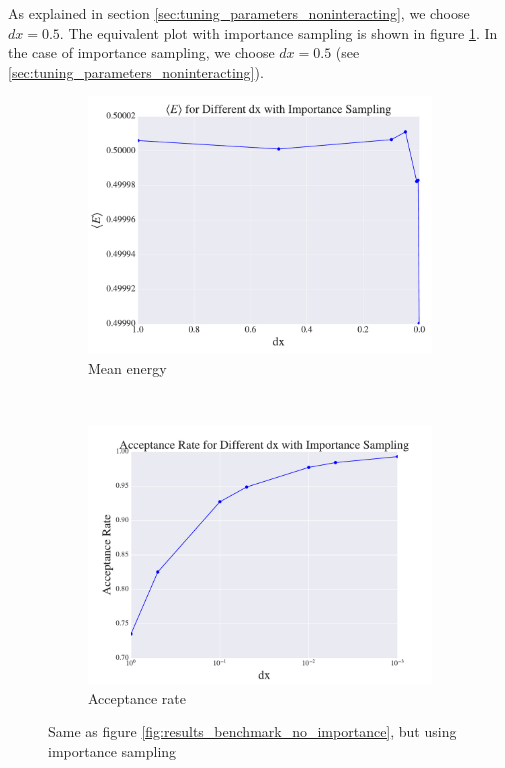 \documentclass[a4paper, 10pt]{article}
\begin{document}
\linebreak
As explained in section \ref{sec:tuning_parameters_noninteracting}, we choose $dx=0.5$. The equivalent plot with importance sampling is shown in figure \ref{fig:results_benchmark_importance}. In the case of importance sampling, we choose $dx=0.5$ (see \ref{sec:tuning_parameters_noninteracting}).
\begin{figure}[ht!]
	\centering
	\begin{subfigure}[b]{0.8\textwidth}
		\centering
		\includegraphics[width=\textwidth]{../Results/E_v_dx_importance.pdf}
		\caption{Mean energy}
	\end{subfigure}
	~
	\begin{subfigure}[b]{0.8\textwidth}
		\centering
		\includegraphics[width=\textwidth]{../Results/AC_importance.pdf}
		\caption{Acceptance rate}
	\end{subfigure}
	\caption{Same as figure \ref{fig:results_benchmark_no_importance}, but using importance sampling}\label{fig:results_benchmark_importance}
\end{figure}
\end{document}
